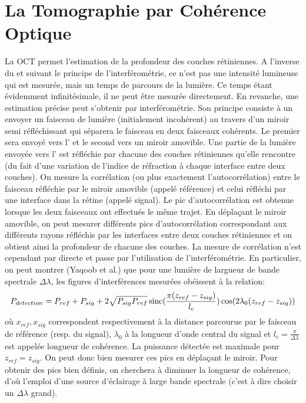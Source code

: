 \section{La Tomographie par Cohérence Optique}

La \ac{OCT} permet l'estimation de la profondeur des couches rétiniennes. A l'inverse du \fundus{} et suivant le principe de l'interférométrie, ce n'est pas une intensité lumineuse qui est mesurée, mais un temps de parcours de la lumière. Ce temps étant évidemment infinitésimale, il ne peut être mesurée directement. En revanche, une estimation précise peut s'obtenir par interférométrie. Son principe consiste à un envoyer un faisceau de lumière (initialement incohérent) au travers d'un miroir semi réfléchissant qui séparera le faisceau en deux faisceaux cohérents. Le premier sera envoyé vers l'\oeil{} et le second vers un miroir amovible. Une partie de la lumière envoyée vers l'\oeil{} est réfléchie par chacune des couches rétiniennes qu'elle rencontre (du fait d'une variation de l'indice de réfraction à chaque interface entre deux couches). On mesure la corrélation (ou plus exactement l'autocorrélation) entre le faisceau réfléchie par le miroir amovible (appelé référence) et celui réfléchi par une interface dans la rétine (appelé signal). Le pic d'autocorrélation est obtenue lorsque les deux faisceaux ont effectués le même trajet. En déplaçant le miroir amovible, on peut mesurer différents pics d'autocorrélation correspondant aux différents rayons réfléchis par les interfaces entre deux couches rétiniennes et on obtient ainsi la profondeur de chacune des couches.
La mesure de corrélation n'est cependant par directe et passe par l'utilisation de l'interférométrie. En particulier, on peut montrer (Yaqoob et al.\cite{yaqoobSpectralDomainOptical2005}) que pour une lumière de largueur de bande spectrale $\Delta \lambda$, les figures d'interférences mesurées obéissent à la relation:
\begin{equation}
	\label{eq:TDOCT}
	P_{detection} = P_{ref}+P_{sig} + 2\sqrt{P_{sig}P_{ref}}\operatorname{sinc}(\frac{\pi(z_{ref}-z_{sig})}{l_c})\cos(2\lambda_0(z_{ref}-z_{sig}))
\end{equation}
où $x_{ref}, x_{sig}$ correspondent respectivement à la distance parcourue par le faisceau de référence (resp. du signal), $\lambda_0$ à la longueur d'onde central du signal et $l_c=\frac{\pi}{\Delta \lambda}$ est appelée longueur de cohérence. La puissance détectée est maximale pour $z_{ref}=z_{sig}$. On peut donc bien mesurer ces pics en déplaçant le miroir. Pour obtenir des pics bien définis, on cherchera à diminuer la longueur de cohérence, d'où l'emploi d'une source d'éclairage à large bande spectrale (c'est à dire choisir un $\Delta  \lambda$ grand).


